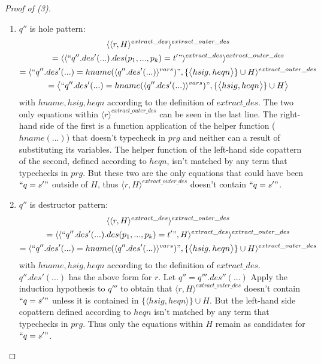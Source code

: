 \documentclass[11pt]{article} %
\begin{document}
\begin{proof}[Proof of (3)]
\begin{enumerate}
\begin{itemize}
\begin{enumerate}
\item $q''$ is hole pattern:
\begin{multline*}
\langle \langle r, H \rangle^{extract\_des} \rangle^{extract\_outer\_des} \\
= \langle \langle `` q''.des'(...).des(p_1, ..., p_k) = t' " \rangle^{extract\_des} \rangle^{extract\_outer\_des} \\
= \langle `` q''.des'(...) = hname(\langle q''.des'(...) \rangle^{vars}) ", \{ \big\langle hsig, heqn \big\rangle \} \cup H \rangle^{extract\_outer\_des} \\
= \big\langle `` q''.des'(...) = hname(\langle q''.des'(...) \rangle^{vars}) ", \{ \big\langle hsig, heqn \big\rangle \} \cup H \big\rangle
\end{multline*}
with $hname, hsig, heqn$ according to the definition of $extract\_des$. The two only equations within $\langle r \rangle^{extract\_outer\_des}$ can be seen in the last line. The right-hand side of the first is a function application of the helper function ($hname(...)$) that doesn't typecheck in $prg$ and neither can a result of substituting its variables. The helper function of the left-hand side copattern of the second, defined according to $heqn$, isn't matched by any term that typechecks in $prg$. But these two are the only equations that could have been $`` q = s' "$ outside of $H$, thus $\langle r, H \rangle^{extract\_outer\_des}$ doesn't contain $`` q = s' "$.

\item $q''$ is destructor pattern:
\begin{multline*}
\langle \langle r, H \rangle^{extract\_des} \rangle^{extract\_outer\_des} \\
= \langle \langle `` q''.des'(...).des(p_1, ..., p_k) = t' ", H \rangle^{extract\_des} \rangle^{extract\_outer\_des} \\
= \langle `` q''.des'(...) = hname(\langle q''.des'(...) \rangle^{vars}) ", \{ \big\langle hsig, heqn \big\rangle \} \cup H \rangle^{extract\_outer\_des}
\end{multline*}
with $hname, hsig, heqn$ according to the definition of $extract\_des$. $q''.des'(...)$ has the above form for $r$. Let $q'' = q'''.des''(...)$ Apply the induction hypothesis to $q'''$ to obtain that $\langle r, H \rangle^{extract\_outer\_des}$ doesn't contain $`` q = s' "$ unless it is contained in $\{ \big\langle hsig, heqn \big\rangle \} \cup H$. But the left-hand side copattern defined according to $heqn$ isn't matched by any term that typechecks in $prg$. Thus only the equations within $H$ remain as candidates for $`` q = s' "$.


\end{enumerate}
\end{itemize}
\end{enumerate}
\end{proof}
\end{document}
